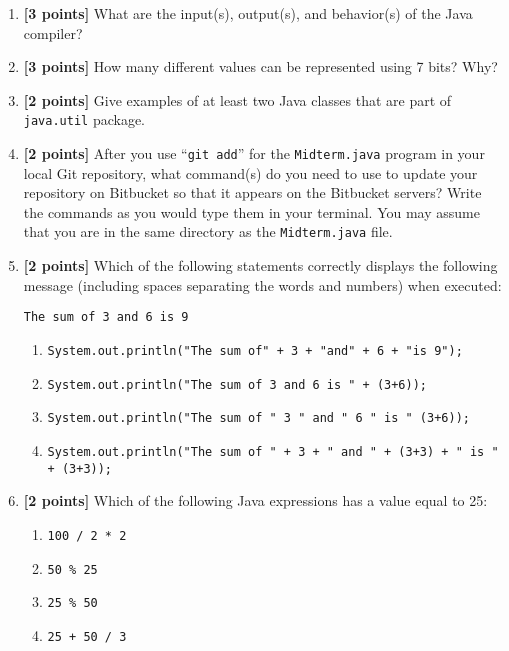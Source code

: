 \documentclass[11pt]{report}
\begin{document}
\begin{enumerate}
\item {\bf [3 points]}
What are the input(s), output(s), and behavior(s) of the Java compiler?

\vspace{.75in}
\item {\bf [3 points]}
How many different values can be represented using 7 bits? Why?

\bigskip
\bigskip
\bigskip
\bigskip

\item {\bf [2 points]}
Give examples of at least two Java classes that are part of {\tt java.util} package.
\vspace{.5in}

\item {\bf [2 points]}
  After you use ``{\tt git add}'' for the {\tt Midterm.java} program in your local Git repository, what command(s) do
  you need to use to update your repository on Bitbucket so that it appears on the Bitbucket servers? Write the commands
  as you would type them in your terminal. You may assume that you are in the same directory as the {\tt Midterm.java}
  file.  

\newpage

\item {\bf [2 points]}
Which of the following statements correctly displays the following
message (including spaces separating the words and numbers) when executed:
\begin{center}
\verb$The sum of 3 and 6 is 9$
\end{center}
\begin{enumerate}
\item \verb$System.out.println("The sum of" + 3 + "and" + 6 + "is 9");$
\item \verb$System.out.println("The sum of 3 and 6 is " + (3+6));$
\item \verb$System.out.println("The sum of " 3 " and " 6 " is " (3+6));$
\item \verb$System.out.println("The sum of " + 3 + " and " + (3+3) + " is " + (3+3));$
\end{enumerate}

\bigskip

\item {\bf [2 points]}
Which of the following Java expressions has a value equal to 25:
\begin{enumerate}
\item \verb$100 / 2 * 2$
\item \verb$50 % 25$
\item \verb$25 % 50$
\item \verb$25 + 50 / 3$
\end{enumerate}


\end{enumerate}
\end{document}
